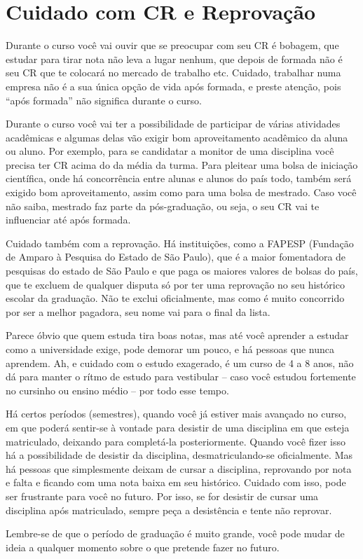 
\section{Cuidado com CR e Reprovação}

Durante o curso você vai ouvir que se preocupar com seu CR é bobagem, que
estudar para tirar nota não leva a lugar nenhum, que depois de formada não é
seu CR que te colocará no mercado de trabalho etc. Cuidado, trabalhar numa
empresa não é a sua única opção de vida após formada, e preste atenção, pois
``após formada'' não significa durante o curso.

Durante o curso você vai ter a possibilidade de participar de várias atividades
acadêmicas e algumas delas vão exigir bom aproveitamento acadêmico da aluna ou
aluno. Por exemplo, para se candidatar a monitor de uma disciplina você precisa
ter CR acima do da média da turma. Para pleitear uma bolsa de iniciação
científica, onde há concorrência entre alunas e alunos do país todo, também
será exigido bom aproveitamento, assim como para uma bolsa de mestrado. Caso
você não saiba, mestrado faz parte da pós-graduação, ou seja, o seu CR vai te
influenciar até após formada.

Cuidado também com a reprovação. Há instituições, como a FAPESP (Fundação de
Amparo à Pesquisa do Estado de São Paulo), que é a maior fomentadora de
pesquisas do estado de São Paulo e que paga os maiores valores de bolsas do
país, que te excluem de qualquer disputa só por ter uma reprovação no seu
histórico escolar da graduação. Não te exclui oficialmente, mas como é muito
concorrido por ser a melhor pagadora, seu nome vai para o final da lista.

Parece óbvio que quem estuda tira boas notas, mas até você aprender a estudar
como a universidade exige, pode demorar um pouco, e há pessoas que nunca
aprendem. Ah, e cuidado com o estudo exagerado, é um curso de 4 a 8 anos, não
dá para manter o rítmo de estudo para vestibular -- caso você estudou
fortemente no cursinho ou ensino médio -- por todo esse tempo.

Há certos períodos (semestres), quando você já estiver mais avançado no curso,
em que poderá sentir-se à vontade para desistir de uma disciplina em que esteja
matriculado, deixando para completá-la posteriormente. Quando você fizer isso
há a possibilidade de desistir da disciplina, desmatricu\-lan\-do\--se
oficialmente. Mas há pessoas que simplesmente deixam de cursar a disciplina,
reprovando por nota e falta e ficando com uma nota baixa em seu histórico.
Cuidado com isso, pode ser frustrante para você no futuro. Por isso, se for
desistir de cursar uma disciplina após matriculado, sempre peça a desistência e
tente não reprovar.

Lembre-se de que o período de graduação é muito grande, você pode mudar de
ideia a qualquer momento sobre o que pretende fazer no futuro.
